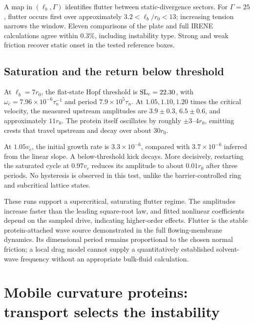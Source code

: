 A map in $(\ell_b,\Gamma)$ identifies flutter between static-divergence sectors. For $\Gamma=25$, flutter occurs first over approximately $3.2<\ell_b/r_0<13$; increasing tension narrows the window. Eleven comparisons of the plate and full IRENE calculations agree within $0.3\%$, including instability type. Strong and weak friction recover static onset in the tested reference boxes.


\subsection{Saturation and the return below threshold}
At $\ell_b=7r_0$, the flat-state Hopf threshold is $\mathrm{SL}_c=22.30$, with $\omega_c=7.96\times10^{-6}\tau_n^{-1}$ and period $7.9\times10^5\tau_n$. At $1.05,1.10,1.20$ times the critical velocity, the measured upstream amplitudes are $3.9\pm0.3$, $6.5\pm0.6$, and approximately $11r_0$. The protein itself oscillates by roughly $\pm3$--$4r_0$, emitting crests that travel upstream and decay over about $30r_0$.

At $1.05v_c$, the initial growth rate is $3.3\times10^{-6}$, compared with $3.7\times10^{-6}$ inferred from the linear slope. A below-threshold kick decays. More decisively, restarting the saturated cycle at $0.97v_c$ reduces its amplitude to about $0.01r_0$ after three periods. No hysteresis is observed in this test, unlike the barrier-controlled ring and subcritical lattice states.

These runs support a supercritical, saturating flutter regime. The amplitudes increase faster than the leading square-root law, and fitted nonlinear coefficients depend on the sampled drive, indicating higher-order effects. Flutter is the stable protein-attached wave source demonstrated in the full flowing-membrane dynamics. Its dimensional period remains proportional to the chosen normal friction; a local drag model cannot supply a quantitatively established solvent-wave frequency without an appropriate bulk-fluid calculation.

\clearpage
\section{Mobile curvature proteins: transport selects the instability}
